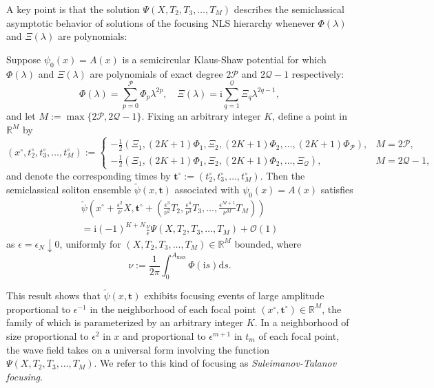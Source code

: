 \documentclass[12pt]{amsart}
\numberwithin{equation}{section}
\newcommand{\dd}{\mathrm{d}}
\newcommand{\ii}{\mathrm{i}}
\newcommand{\SP}{\lambda}
\newcommand{\phaseint}{\Phi}
\newcommand{\tailint}{\Xi}
\newcommand{\eps}{\epsilon}
\newcommand{\bigo}[1]{ \mathcal{O}\! \left( #1 \right) }
\begin{document}
A key point is that the solution $\Psi(X,T_2,T_3,\dots,T_M)$ describes the semiclassical asymptotic behavior of solutions of the focusing NLS hierarchy whenever $\phaseint(\SP)$ and $\tailint(\SP)$ are polynomials:
\begin{thm}
Suppose $\psi_0(x)=A(x)$ is a semicircular Klaus-Shaw potential for which $\phaseint(\SP)$ and $\tailint(\SP)$ are polynomials of exact degree $2\mathcal{P}$ and $2\mathcal{Q}-1$ respectively:
\begin{equation}
\phaseint(\SP)=\sum_{p=0}^\mathcal{P} \phaseint_{p}\lambda^{2p},\quad \tailint(\SP)=\ii\sum_{q=1}^\mathcal{Q} \tailint_q\lambda^{2q-1}, 
\label{eq:polynomial-forms}
\end{equation}
and let $M:=\max\{2\mathcal{P},2\mathcal{Q}-1\}$.  Fixing an arbitrary integer $K$, define a point in $\mathbb{R}^M$ by
\begin{equation}
(x^\circ,t_2^\circ,t_3^\circ,\dots,t_M^\circ):=\begin{cases}
-\frac{1}{2}\left(\tailint_1,(2K+1)\phaseint_1,\tailint_2,(2K+1)\phaseint_2,\dots,(2K+1)\phaseint_\mathcal{P}\right),& M=2\mathcal{P},\\
-\frac{1}{2}\left(\tailint_1,(2K+1)\phaseint_1,\tailint_2,(2K+1)\phaseint_2,\dots,\tailint_\mathcal{Q}\right),&M=2\mathcal{Q}-1,
\end{cases}
\label{eq:focus-K}
\end{equation}
and denote the corresponding times by $\mathbf{t}^\circ:=(t_2^\circ,t_3^\circ,\dots,t_M^\circ)$.
Then the semiclassical soliton ensemble $\widetilde{\psi}(x,\mathbf{t})$ associated with $\psi_0(x)=A(x)$ satisfies 
\begin{multline}
\widetilde{\psi}\left(x^\circ+\frac{\epsilon^2}{\nu}X,\mathbf{t}^\circ + \left(\frac{\epsilon^3}{\nu^{2}}T_2,\frac{\epsilon^4}{\nu^{3}}T_3,\dots,\frac{\epsilon^{M+1}}{\nu^{M}}T_M\right)\right)\\
{}=\ii (-1)^{K+N}  \frac{\nu}{\eps}\Psi(X,T_2,T_3,\dots,T_M) + \bigo{1}
\label{eq:hierarchy-focus-approx}
\end{multline}
as $\eps=\eps_N\downarrow 0$, uniformly for $(X,T_2,T_3,\dots,T_M)\in\mathbb{R}^M$ bounded, where
\begin{equation}
\nu:=\frac{1}{2\pi} \int_0^{A_\mathrm{max}} \phaseint(\ii s) \dd s.
\label{eq:nu-formula}
\end{equation}
\label{thm:multi-time}
\end{thm}
This result shows that $\widetilde{\psi}(x,\mathbf{t})$ exhibits focusing events of large amplitude proportional to $\eps^{-1}$ in the neighborhood of each focal point $(x^\circ,\mathbf{t}^\circ)\in\mathbb{R}^M$, the family of which is parameterized by an arbitrary integer $K$.  In a neighborhood of size proportional to $\eps^2$ in $x$ and proportional to $\eps^{m+1}$ in $t_m$ of each focal point, the wave field takes on a universal form involving the function $\Psi(X,T_2,T_3,\dots,T_M)$.  We refer to this kind of focusing as \emph{Suleimanov-Talanov focusing}.
\end{document}
